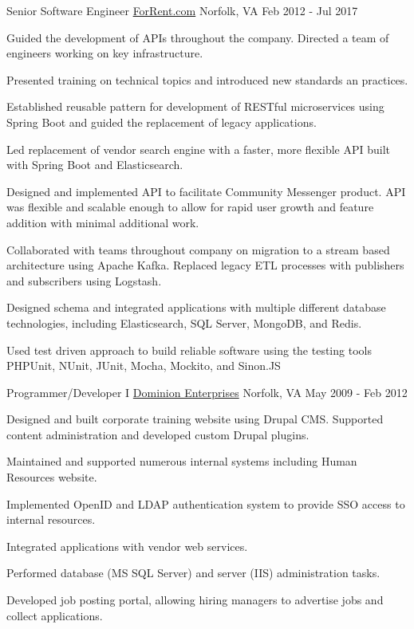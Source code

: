 \begin{cventries}
  \cventry
  {Senior Software Engineer} %
  {\href{https://www.forrent.com}{ForRent.com}} %
  {Norfolk, VA} %
  {Feb 2012 - Jul 2017} %
  {
    \begin{cvitems} %
      \item {Guided the development of APIs throughout the company. Directed a
      team of engineers working on key infrastructure.}
      \item {Presented training on technical topics and introduced new standards
      an practices.}
      \item {Established reusable pattern for development of RESTful
      microservices using Spring Boot and guided the replacement of legacy
      applications.}
      \item {Led replacement of vendor search engine with a faster, more
      flexible API built with Spring Boot and Elasticsearch.}
      \item {Designed and implemented API to facilitate Community Messenger
      product. API was flexible and scalable enough to allow for rapid user
      growth and feature addition with minimal additional work.}
      \item {Collaborated with teams throughout company on migration to a stream
      based architecture using Apache Kafka. Replaced legacy ETL processes with
      publishers and subscribers using Logstash.}
      \item {Designed schema and integrated applications with multiple different
      database technologies, including Elasticsearch, SQL Server, MongoDB, and
      Redis.}
      \item {Used test driven approach to build reliable software using the
      testing tools PHPUnit, NUnit, JUnit, Mocha, Mockito, and Sinon.JS}
    \end{cvitems}
  }

  \cventry
    {Programmer/Developer I} %
    {\href{https://www.dominionenterprises.com}{Dominion Enterprises}} %
    {Norfolk, VA} %
    {May 2009 - Feb 2012} %
    {
      \begin{cvitems} %
        \item {Designed and built corporate training website using Drupal CMS.
        Supported content administration and developed custom Drupal plugins.}
        \item {Maintained and supported numerous internal systems including
        Human Resources website.}
        \item {Implemented OpenID and LDAP authentication system to provide SSO
        access to internal resources.}
        \item {Integrated applications with vendor web services.}
        \item {Performed database (MS SQL Server) and server (IIS)
        administration tasks.}
        \item {Developed job posting portal, allowing hiring managers to
        advertise jobs and collect applications.}
      \end{cvitems}
    }

\end{cventries}
